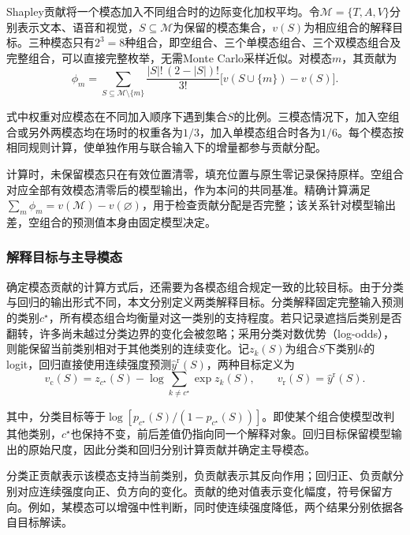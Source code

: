 \documentclass[UTF8,a4paper,12pt]{ctexart}
\newcommand{\QThreeParagraph}{\par\noindent\hspace*{2em}}
\begin{document}
Shapley贡献将一个模态加入不同组合时的边际变化加权平均。令$\mathcal M=\{T,A,V\}$分别表示文本、语音和视觉，$S\subseteq\mathcal M$为保留的模态集合，$v(S)$为相应组合的解释目标。三种模态只有$2^3=8$种组合，即空组合、三个单模态组合、三个双模态组合及完整组合，可以直接完整枚举，无需Monte Carlo采样近似。对模态$m$，其贡献为
\begin{equation}
\phi_m
=\sum_{S\subseteq\mathcal M\setminus\{m\}}
\frac{|S|!\,(2-|S|)!}{3!}
\bigl[v(S\cup\{m\})-v(S)\bigr].
\label{eq:q3_shapley}
\end{equation}
\QThreeParagraph 式中权重对应模态在不同加入顺序下遇到集合$S$的比例。三模态情况下，加入空组合或另外两模态均在场时的权重各为$1/3$，加入单模态组合时各为$1/6$。每个模态按相同规则计算，使单独作用与联合输入下的增量都参与贡献分配。

\QThreeParagraph 计算时，未保留模态只在有效位置清零，填充位置与原生零记录保持原样。空组合对应全部有效模态清零后的模型输出，作为本问的共同基准。精确计算满足$\sum_m\phi_m=v(\mathcal M)-v(\varnothing)$，用于检查贡献分配是否完整；该关系针对模型输出差，空组合的预测值本身由固定模型决定。

\subsubsection{解释目标与主导模态}
\QThreeParagraph 确定模态贡献的计算方式后，还需要为各模态组合规定一致的比较目标。由于分类与回归的输出形式不同，本文分别定义两类解释目标。分类解释固定完整输入预测的类别$c^\star$，所有模态组合均衡量对这一类别的支持程度。若只记录遮挡后类别是否翻转，许多尚未越过分类边界的变化会被忽略；采用分类对数优势（log-odds），则能保留当前类别相对于其他类别的连续变化。记$z_k(S)$为组合$S$下类别$k$的logit，回归直接使用连续强度预测$\widehat y^{\mathrm r}(S)$，两种目标定义为
\begin{equation}
v_{\mathrm c}(S)
=z_{c^\star}(S)-\log\!\sum_{k\ne c^\star}\exp z_k(S),
\qquad
v_{\mathrm r}(S)=\widehat y^{\mathrm r}(S).
\label{eq:q3_value}
\end{equation}
\QThreeParagraph 其中，分类目标等于$\log[p_{c^\star}(S)/(1-p_{c^\star}(S))]$。即使某个组合使模型改判其他类别，$c^\star$也保持不变，前后差值仍指向同一个解释对象。回归目标保留模型输出的原始尺度，因此分类和回归分别计算贡献并确定主导模态。

\QThreeParagraph 分类正贡献表示该模态支持当前类别，负贡献表示其反向作用；回归正、负贡献分别对应连续强度向正、负方向的变化。贡献的绝对值表示变化幅度，符号保留方向。例如，某模态可以增强中性判断，同时使连续强度降低，两个结果分别依据各自目标解读。
\end{document}
